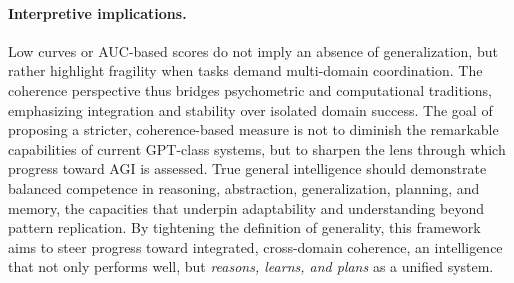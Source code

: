 \documentclass{article}
\begin{document}
\paragraph{Interpretive implications.}
Low curves or AUC-based scores do not imply an absence of generalization, 
but rather highlight fragility when tasks demand multi-domain coordination.  
The coherence perspective thus bridges psychometric and computational traditions, 
emphasizing integration and stability over isolated domain success.
The goal of proposing a stricter, coherence-based measure is not to diminish 
the remarkable capabilities of current GPT-class systems, but to sharpen the lens 
through which progress toward AGI is assessed.  
True general intelligence should demonstrate balanced competence in reasoning, abstraction, generalization, planning, and memory, the capacities that underpin adaptability and understanding beyond pattern replication.  
By tightening the definition of generality, this framework aims to steer progress toward integrated, cross-domain coherence, an intelligence that not only performs well, but \emph{reasons, learns, and plans} as a unified system.

\end{document}
